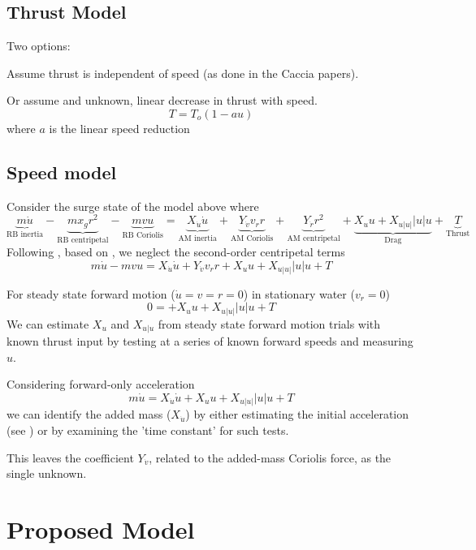 \documentclass[11pt,draftcls,journal,onecolumn]{IEEEtran}
\begin{document}
\subsection{Thrust Model}
Two options:

Assume thrust is independent of speed (as done in the Caccia papers).

Or assume and unknown, linear decrease in thrust with speed.
\[
T = T_o (1-au)
\]
where $a$ is the linear speed reduction
\subsection{Speed model}
Consider the surge state of the model above where
\begin{equation}
\underbrace{m \dot{u}}_\text{RB inertia}  
- \underbrace{m x_g r^2}_\text{RB centripetal}
- \underbrace{mvu}_\text{RB Coriolis}
=
\underbrace{X_{\dot{u}} \dot{u}}_\text{AM inertia}
+ \underbrace{Y_{\dot{v}}v_r r}_\text{AM Coriolis}
+ \underbrace{Y_{\dot{r}}r^2}_\text{AM centripetal}
+ \underbrace{X_u u + X_{u|u|}|u|u}_\text{Drag} 
+ \underbrace{T}_\text{Thrust}
\end{equation}
Following \cite{caccia08practical}, based on \cite{fossen94guidance}, we neglect the second-order centripetal terms
\begin{equation}
m \dot{u}
- mvu
=
X_{\dot{u}} \dot{u}
+ Y_{\dot{v}}v_r r
+ X_u u + X_{u|u|}|u|u
+ T
\end{equation}

For steady state forward motion ($\dot{u}=v=r=0$) in stationary water ($v_r=0$)
\begin{equation}
0 =
+ X_u u + X_{u|u|}|u|u
+ T
\end{equation}
We can estimate $X_u$ and $X_{u|u}$ from steady state forward motion trials with known thrust input by testing at a series of known forward speeds and measuring $u$.

Considering forward-only acceleration
\begin{equation}
m \dot{u}
=
X_{\dot{u}} \dot{u}
+ X_u u + X_{u|u|}|u|u
+ T
\end{equation}
we can identify the added mass ($X_{\dot{u}}$) by either estimating the initial acceleration (see \cite{sonnenburg10control}) or by examining the 'time constant' for such tests.

This leaves the coefficient $Y_{\dot{v}}$, related to the added-mass Coriolis force, as the single unknown.


\section{Proposed Model}
\end{document}
